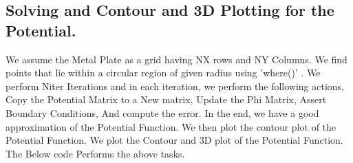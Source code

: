 \documentclass[12pt, a4paper]{report}
\begin{document}
\subsection{Solving and Contour and 3D Plotting for the Potential.}
We assume the Metal Plate as a grid having NX rows and NY Columns. We find points that lie within a circular region of given radius using {\selectfont
'where()'
}. We perform Niter Iterations and in each iteration, we perform the following actions, Copy the Potential Matrix to a New matrix, Update the Phi Matrix, Assert Boundary Conditions, And compute the error. In the end, we have a good approximation of the Potential Function. We then plot the contour plot of the Potential Function. We plot the Contour and 3D plot of the Potential Function. The Below code Performs the above tasks.
\noindent

\end{document}
